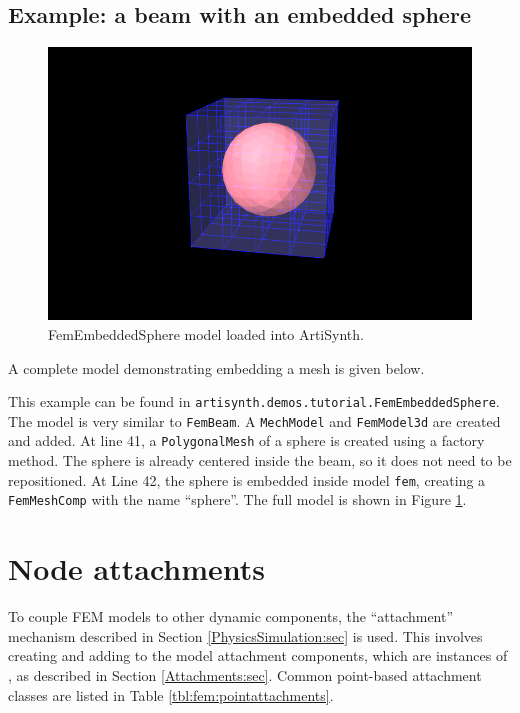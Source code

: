 \subsection{Example: a beam with an embedded sphere}

\begin{figure}[ht]
	\centering
	\includegraphics[width=\imglength]{images/FemEmbeddedSphere}
	\caption{FemEmbeddedSphere model loaded into ArtiSynth.}
	\label{fig:fem:embedded}
\end{figure}

A complete model demonstrating embedding a mesh is given below.
\lstset{numbers=left}

\lstset{numbers=none}
This example can be found in {\tt artisynth.demos.tutorial.FemEmbeddedSphere}.
The model is very similar to {\tt FemBeam}.  A {\tt MechModel} and 
{\tt FemModel3d} are created and added.  At line 41, a {\tt PolygonalMesh}
of a sphere is created using a factory method.  The sphere is already
centered inside the beam, so it does not need to be repositioned.  At Line
42, the sphere is embedded inside model {\tt fem}, creating a {\tt FemMeshComp}
with the name ``sphere''.  The full model is shown in Figure 
\ref{fig:fem:embedded}.

\section{Node attachments}
\label{sec:fem:nodeattachments}

To couple FEM models to other dynamic components, the ``attachment''
mechanism described in Section \ref{PhysicsSimulation:sec} is used.
This involves creating and adding to the model attachment components,
which are instances of ,
as described in Section \ref{Attachments:sec}.  
Common point-based
attachment classes are listed in Table \ref{tbl:fem:pointattachments}.

